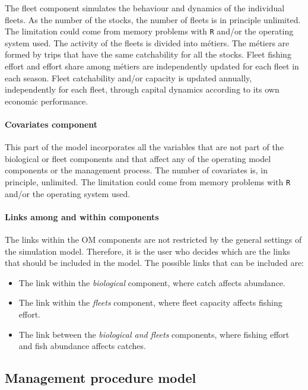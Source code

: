   The fleet component simulates the behaviour and dynamics of the individual fleets. As the number of the stocks, the number of fleets is in 
  principle unlimited. The limitation could come from memory problems with \texttt{R} and/or the operating system used. The activity of the fleets is divided into m\'etiers. The m\'etiers are formed by trips that have the same catchability for all the stocks. 
  Fleet fishing effort and effort share among m\'etiers are independently updated for each fleet in each season. Fleet catchability and/or capacity is updated annually, independently for each fleet, through capital dynamics according to its own economic performance. 

\paragraph{Covariates component} \hspace{0pt} \smallskip

  This part of the model incorporates all the variables that are not part of the biological or fleet components and that affect any of the operating model components or the management process. The number of covariates is, in principle, unlimited. The limitation could come from memory problems with \texttt{R} and/or the operating system used.

\paragraph{Links among and within components} \hspace{0pt} \smallskip

  The links within the OM components are not restricted by the general settings of the simulation model. Therefore, it is the user who decides 
  which are the links that should be included in the model. The possible links that can be included are:

  \begin{itemize}
  	\item The link within the \textsl{biological} component, where catch affects abundance.
  	\item The link within the \textsl{fleets} component, where fleet capacity affects fishing effort. 
  	\item The link between the \textsl{biological and fleets} components, where fishing effort and fish abundance affects catches. 
  \end{itemize}

 
\subsection{Management procedure model}

